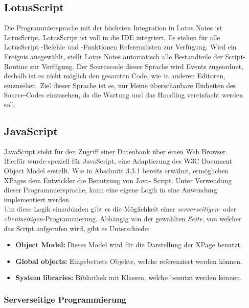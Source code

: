 \subsection{LotusScript}
\label{sec:4designelemente}

Die Programmiersprache mit der höchsten Integration in Lotus Notes ist LotusScript. LotusScript ist voll in die IDE integriert.  
Es stehen für alle LotusScript -Befehle und -Funktionen Referenzlisten zur Verfügung.
Wird ein Ereignis ausgewählt, stellt Lotus Notes automatisch alle Bestandteile der Script-Routine zur Verfügung.
Der Sourcecode dieser Sprache wird Events zugeordnet, deshalb ist es nicht möglich den gesamten Code, wie in anderen Editoren, einzusehen.
Ziel dieser Sprache ist es, nur kleine überschaubare Einheiten des Source-Codes einzusehen, da die Wartung und das Handling vereinfacht werden 
soll\cite{mann}. 

\subsection{JavaScript}
\label{sec:4designelemente}

JavaScript steht für den Zugriff einer Datenbank über einen Web Browser. Hierfür wurde \linebreak speziell für JavaScript, eine Adaptierung des W3C Document
Object Model erstellt.
Wie in Abschnitt 3.3.1 bereits erwähnt, ermöglichen XPages dem Entwickler die Benutzung von Java- Script. Unter Verwendung dieser
Programmiersprache, kann eine eigene Logik in eine \linebreak Anwendung implementiert werden\cite{donelly}.\\ 
Um diese Logik einzubinden gibt es die Möglichkeit einer \textit{ serverseitigen-} oder \textit{ clientseitigen-}Programmierung.
Abhängig von der gewählten \textit{Seite}, von welcher das Script aufgerufen wird, gibt es Unterschiede:
\begin{itemize}
\item \textbf{Object Model:} Dieses Model wird für die Darstellung der XPage benutzt. 
\item \textbf{Global objects:} Eingebettete Objekte, welche referenziert werden können.
\item \textbf{System libraries:} Bibliothek mit Klassen, welche benutzt werden können.
\end{itemize}

\subsubsection{Serverseitige Programmierung}
\label{javascript}

